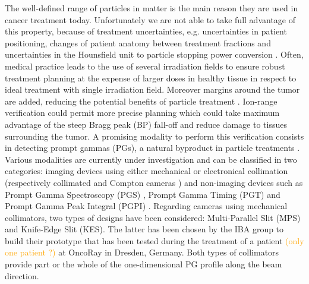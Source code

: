 \documentclass[a4paper,english,12pt]{article}
\newcommand{\ds}[2][orange]{\textcolor{#1}{#2}}
\begin{document}
The well-defined range of particles in matter is the main reason they are used in cancer treatment today. Unfortunately we are not able to take full advantage of this property, because of treatment uncertainties, e.g. uncertainties in patient positioning, changes of patient anatomy between treatment fractions and uncertainties in the Hounsfield unit to particle stopping power conversion \citep{Paganetti2012}. Often, medical practice leads to the use of several irradiation fields to ensure robust treatment planning at the expense of larger doses in healthy tissue in respect to ideal treatment with single irradiation field. Moreover margins around the tumor are added, reducing the potential benefits of particle treatment \citep{Knopf2013}. Ion-range verification could permit more precise planning which could take maximum advantage of the steep Bragg peak (BP) fall-off and reduce damage to tissues surrounding the tumor. A promising modality to perform this verification consists in detecting prompt gammas (PGs), a natural byproduct in particle treatments \citep{Krimmer2017a, Parodi2018}. Various modalities are currently under investigation and can be classified in two categories: imaging devices using either mechanical or electronical collimation (respectively collimated \citep{Perali2014, Min2012, Pinto2014a} and Compton cameras \citep{Krimmer2015,Kurosawa2012,Thirolf2016,Polf2015,Llosa2016}) and non-imaging devices such as Prompt Gamma Spectroscopy (PGS) \citep{Hueso-Gonzalez2016}, Prompt Gamma Timing (PGT) \citep{Pausch2016} and Prompt Gamma Peak Integral (PGPI) \citep{Krimmer2017}. Regarding cameras using mechanical collimators, two types of designs have been considered: Multi-Parallel Slit (MPS) and Knife-Edge Slit (KES). The latter has been chosen by the IBA group to build their prototype that has been tested during the treatment of a patient \ds{(only one patient ?)} at OncoRay in Dresden, Germany. Both types of collimators provide part or the whole of the one-dimensional PG profile along the beam direction.
\end{document}
